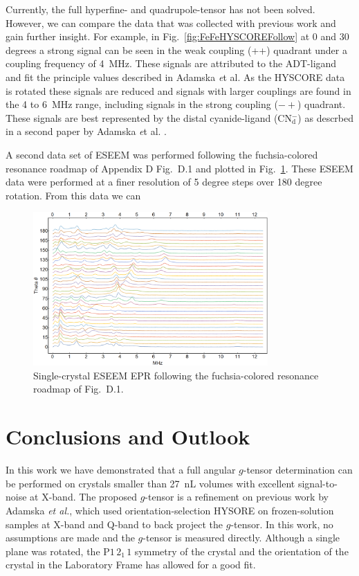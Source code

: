 Currently, the full hyperfine- and quadrupole-tensor has not been solved. However, we can compare the data that was collected with previous work and gain further insight. For example, in Fig.~\ref{fig:FeFeHYSCOREFollow} at 0 and 30 degrees a strong signal can be seen in the weak coupling (++) quadrant under a coupling frequency of 4~MHz. These signals are attributed to the ADT-ligand and fit the principle values described in Adamska {\textit et al.} \cite{Adamska2015pdt} As the HYSCORE data is rotated these signals are reduced and signals with larger couplings are found in the 4 to 6~MHz range, including signals in the strong coupling ($-+$) quadrant. These signals are best represented by the distal cyanide-ligand (CN$_\text{d}^-$) as descrbed in a second paper by Adamska {\textit et al.} \cite{Adamska2015}.

A second data set of ESEEM was performed following the fuchsia-colored resonance roadmap of Appendix D Fig.~D.1 and plotted in Fig.~\ref{fig:ESEEM2}. These ESEEM data were performed at a finer resolution of 5 degree steps over 180 degree rotation. From this data we can 

\begin{figure}[ht]
\centering
 \includegraphics[width=0.8\textwidth]{Kapitel/Appendix/ESEEMFirstPeak.eps}
 \caption[Single-crystal ESEEM EPR: Fuchsia Trace.]{Single-crystal ESEEM EPR following the fuchsia-colored resonance roadmap of Fig.~D.1.} \label{fig:ESEEM2}
\end{figure}

\section{Conclusions and Outlook}
In this work we have demonstrated that a full angular $g$-tensor determination can be performed on crystals smaller than 27~nL volumes with excellent signal-to-noise at X-band. The proposed $g$-tensor is a refinement on previous work by Adamska {\em et al.}, which used orientation-selection HYSORE on frozen-solution samples at X-band and Q-band to back project the $g$-tensor. In this work, no assumptions are made and the $g$-tensor is measured directly. Although a single plane was rotated, the P$1\,2_1\,1$ symmetry of the crystal and the orientation of the crystal in the Laboratory Frame has allowed for a good fit. 

